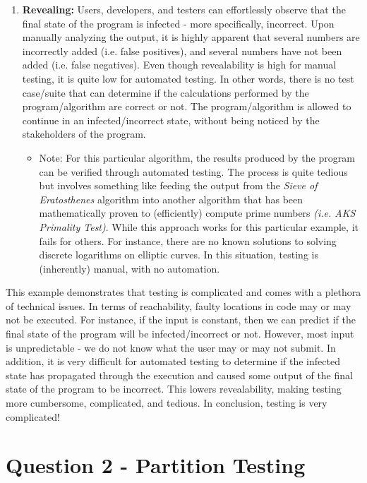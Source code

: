 \documentclass{article}
\begin{document}
\begin{enumerate}
    \item \textbf{Revealing:} Users, developers, and testers can effortlessly observe that the final state of the program is infected - more specifically, incorrect. Upon manually analyzing the output, it is highly apparent that several numbers are incorrectly added (i.e. false positives), and several numbers have not been added (i.e. false negatives). Even though revealability is high for manual testing, it is quite low for automated testing. In other words, there is no test case/suite that can determine if the calculations performed by the program/algorithm are correct or not. The program/algorithm is allowed to continue in an infected/incorrect state, without being noticed by the stakeholders of the program.

        \begin{itemize}
            \item Note: For this particular algorithm, the results produced by the program can be verified through automated testing. The process is quite tedious but involves something like feeding the output from the \textit{Sieve of Eratosthenes} algorithm into another algorithm that has been mathematically proven to (efficiently) compute prime numbers \textit{(i.e. AKS Primality Test)}. While this approach works for this particular example, it fails for others. For instance, there are no known solutions to solving discrete logarithms on elliptic curves. In this situation, testing is (inherently) manual, with no automation.
        \end{itemize}

\end{enumerate}

This example demonstrates that testing is complicated and comes with a plethora of technical issues. In terms of reachability, faulty locations in code may or may not be executed. For instance, if the input is constant, then we can predict if the final state of the program will be infected/incorrect or not. However, most input is unpredictable - we do not know what the user may or may not submit. In addition, it is very difficult for automated testing to determine if the infected state has propagated through the execution and caused some output of the final state of the program to be incorrect. This lowers revealability, making testing more cumbersome, complicated, and tedious. In conclusion, testing is very complicated!

\section*{Question 2 - Partition Testing}
\end{document}
